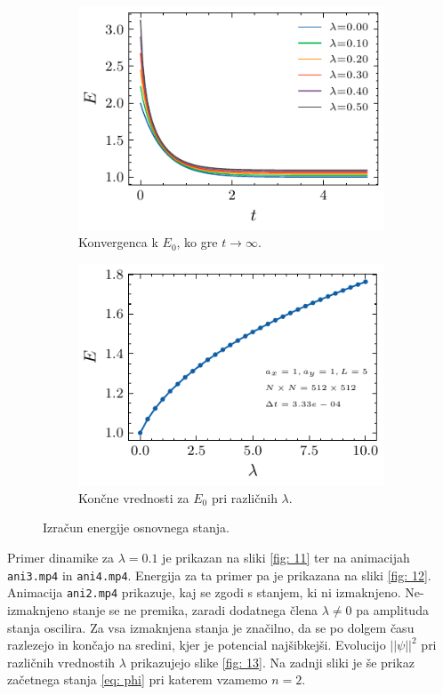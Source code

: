 \documentclass[11pt]{report}
\begin{document}
\begin{figure}[h!]
	\centering
	\begin{subfigure}[b]{0.49\textwidth}
		\centering
		\includegraphics{Evst.pdf}
		\caption{Konvergenca k $E_0$, ko gre $t \rightarrow \infty$.}
		\label{fig: 10a}
	\end{subfigure}
	\hfill
	\begin{subfigure}[b]{0.49\textwidth}
		\centering
		\includegraphics{EvsLam1.pdf}
		\caption{Končne vrednosti za $E_0$ pri različnih $\lambda$.}
		\label{fig: 10b}
	\end{subfigure}
	\caption{Izračun energije osnovnega stanja.}
	\label{fig: 10}
\end{figure}

\noindent
Primer dinamike za $\lambda=0.1$ je prikazan na sliki \ref{fig: 11} ter na animacijah \texttt{ani3.mp4} in \texttt{ani4.mp4}.
Energija za ta primer pa je prikazana na sliki \ref{fig: 12}.
Animacija \texttt{ani2.mp4} prikazuje, kaj se zgodi s stanjem, ki ni izmaknjeno.
Ne-izmaknjeno stanje se ne premika, zaradi dodatnega člena $\lambda \neq 0$ pa amplituda stanja oscilira.
Za vsa izmaknjena stanja je značilno, da se po dolgem času razlezejo in končajo na sredini, kjer je
potencial najšibkejši.
Evolucijo $|| \psi ||^2$ pri različnih vrednostih $\lambda$ prikazujejo slike \ref{fig: 13}.
Na zadnji sliki je še prikaz začetnega stanja \ref{eq: phi} pri katerem vzamemo $n=2$.
\end{document}
